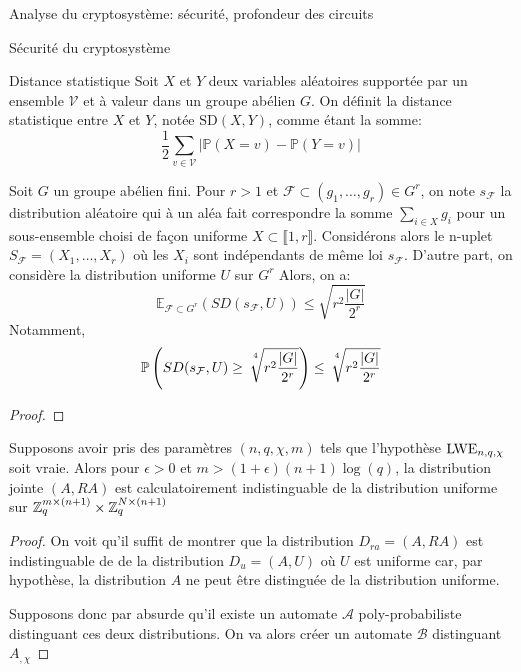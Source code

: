 \begin{section}{Analyse du cryptosystème: sécurité, profondeur des circuits}
	\begin{subsection}{Sécurité du cryptosystème}
	\begin{definition}{Distance statistique}
	Soit $X$ et $Y$ deux variables aléatoires supportée par
	un ensemble $\mathcal{V}$ et à valeur 
	dans un groupe abélien $G$. On définit la distance 
	statistique entre $X$ et $Y$, notée $\text{SD}(X,Y)$, 
	comme étant la somme:
	\[ \frac{1}{2} \sum_{v \in \mathcal{V}} |\mathbb{P}(X = v) -
	\mathbb{P}(Y = v)| \]

	\end{definition}
	\begin{prop}
	Soit $G$ un groupe abélien fini. Pour $r > 1$ et 
	$\mathcal{F} \subset (g_1, \ldots, g_r) \in G^r$, on
	note
	 $s_\mathcal{F}$ la distribution aléatoire qui à un aléa
	 fait correspondre la somme $\sum_{i\in X} g_i$ pour un
	 sous-ensemble choisi de façon uniforme  $X\subset \llbracket
	 1, r \rrbracket$. 
	 Considérons alors le n-uplet $S_\mathcal{F} = (X_1, \ldots, X_r)$ où 
	 les $X_i$ sont indépendants de même loi
	 $s_\mathcal{F}$.
	 D'autre part, on considère la distribution uniforme
	 $U$ sur $G^r$
	 Alors, on a: 
	 \[\mathbb{E}_{\mathcal{F}\subset G^r}(SD(s_\mathcal{F},U)) \leq 
	   \sqrt{r^2\frac{|G|}{2^r}}\]
	 Notamment, 
	 \[\mathbb{P}\left(SD(s_\mathcal{F},U) \geq
		 \sqrt[\leftroot{-3}\uproot{8}4\:]{r^2\frac{|G|}{2^r}} \right) \leq
		 \sqrt[\leftroot{-3}\uproot{8}4\:]{r^2\frac{|G|}{2^r}}
	 \]
	\end{prop}
	\begin{proof}
	\end{proof}
	\begin{prop}
		Supposons avoir pris des paramètres $(n, q, \chi, m)$
	tels que l'hypothèse $\text{LWE}_{n,q,\chi}$ soit vraie. Alors pour $\epsilon>0$
	et $m > (1+\epsilon)(n+1)\log(q)$, la distribution jointe 
	$(A, RA)$ est calculatoirement indistinguable de la
	distribution uniforme sur $\mathbb{Z}_q^{m \times (n+1)} \times \mathbb{Z}_q^{N
	\times (n+1)}$
	\end{prop}
	\begin{proof}
		On voit qu'il suffit de montrer que la distribution $D_{ra} = (A, RA)$ 
		est indistinguable de de la distribution $D_{u} = (A, U)$ où $U$ est
		uniforme car, par hypothèse, la distribution $A$ ne peut être distinguée de 
		la distribution uniforme. 

		Supposons donc par absurde qu'il existe un automate $\mathcal{A}$
		poly-probabiliste distinguant ces deux distributions. On va
		alors créer un automate $\mathcal{B}$ distinguant  $A_{,\chi}$


\end{proof}
\end{subsection}
\end{section}
